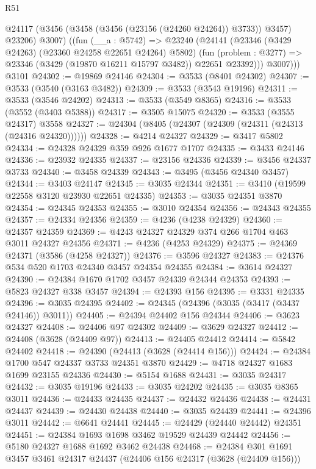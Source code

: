 \begin{lexlean}{R51}
\begin{coremodule}
        @24117 (@3456 (@3458 (@3456 (@23156 (@24260 @24264)) @3733)) @3457) @23206)
          @3007)
        ((fun (__a : @5742) =>
        @23240
          (@24141
            (@23346 (@3429 @24263) (@23360 @24258 @22651 @24264) @5802)
            (fun (problem : @3277) => @23346 (@3429 (@19870 @16211 @15797 @3482)) @22651 @23392)))
          @3007)))
    @3101
@24302 := @19869 @24146
@24304 := @3533 (@8401 @24302)
@24307 := @3533 (@3540 (@3163 @3482))
@24309 := @3533 (@3543 @19196)
@24311 := @3533 (@3546 @24202)
@24313 := @3533 (@3549 @8365)
@24316 := @3533 (@3552 (@3403 @5388))
@24317 := @3505 @15075
@24320 := @3533 (@3555 @24317) @3558
@24327 := @24304 (@8405 (@24307 (@24309 (@24311 (@24313 (@24316 @24320))))))
@24328 := @4214 @24327
@24329 := @3417 @5802
@24334 := @24328 @24329 @359 @926 @1677 @1707
@24335 := @3433 @24146
@24336 := @23932 @24335
@24337 := @23156 @24336
@24339 := @3456 @24337 @3733
@24340 := @3458 @24339
@24343 := @3495 (@3456 @24340 @3457)
@24344 := @3403 @24147
@24345 := @3035 @24344
@24351 := @3410 (@19599 @22558 @3120 @23930 @22651 @24335)
@24353 := @3035 @24351 @3870
@24354 := @24345 @24353
@24355 := @3010 @24354
@24356 := @24343 @24355
@24357 := @24334 @24356
@24359 := @4236 (@4238 @24329)
@24360 := @24357 @24359
@24369 := @4243 @24327 @24329 @374 @266 @1704 @463 @3011 @24327 @24356
@24371 := @4236 (@4253 @24329)
@24375 := @24369 @24371 (@3586 (@4258 @24327))
@24376 := @3596 @24327
@24383 := @24376 @534 @520 @1703 @24340 @3457 @24354 @24355
@24384 := @3614 @24327
@24390 := @24384 @1670 @1702 @3457 @24339 @24344 @24353
@24393 := @5823 @24327 @338 @3457
@24394 := @24393 @156
@24395 := @3331 @24335
@24396 := @3035 @24395
@24402 := @24345 (@24396 (@3035 (@3417 (@3437 @24146)) @3011))
@24405 := @24394 @24402 @156 @24344
@24406 := @3623 @24327
@24408 := @24406 @97 @24302
@24409 := @3629 @24327
@24412 := @24408 (@3628 (@24409 @97))
@24413 := @24405 @24412
@24414 := @5842 @24402
@24418 := @24390 (@24413 (@3628 (@24414 @156)))
@24424 := @24384 @1700 @547 @24337 @3733 @24351 @3870
@24429 := @4718 @24327 @1683 @1699 @23155 @24336
@24430 := @5154 @1688
@24431 := @3035 @24317
@24432 := @3035 @19196
@24433 := @3035 @24202
@24435 := @3035 @8365 @3011
@24436 := @24433 @24435
@24437 := @24432 @24436
@24438 := @24431 @24437
@24439 := @24430 @24438
@24440 := @3035 @24439
@24441 := @24396 @3011
@24442 := @6641 @24441
@24445 := @24429 (@24440 @24442) @24351
@24451 := @24384 @1693 @1698 @3462 @19529 @24439 @24442
@24456 := @5180 @24327 @1688 @1692 @3462 @24438
@24468 := @24384 @301 @1691 @3457 @3461 @24317 @24437 (@24406 @156 @24317 (@3628 (@24409 @156)))

\end{coremodule}
\end{lexlean}
